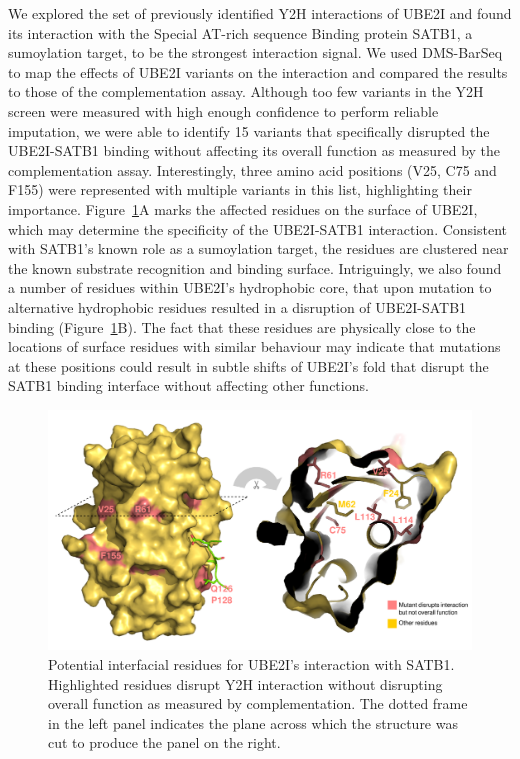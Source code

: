 
We explored the set of previously identified Y2H interactions of UBE2I and found its interaction with the Special AT-rich sequence Binding protein SATB1, a sumoylation target, to be the strongest interaction signal. We used DMS-BarSeq to map the effects of UBE2I variants on the interaction and compared the results to those of the complementation assay. Although too few variants in the Y2H screen were measured with high enough confidence to perform reliable imputation, we were able to identify 15 variants that specifically disrupted the UBE2I-SATB1 binding without affecting its overall function as measured by the complementation assay. Interestingly, three amino acid positions (V25, C75 and F155) were represented with multiple variants in this list, highlighting their importance. Figure~\ref{fig:y2hVScompl}A marks the affected residues on the surface of UBE2I, which may determine the specificity of the UBE2I-SATB1 interaction. Consistent with SATB1's known role as a sumoylation target, the residues are clustered near the known substrate recognition and binding surface. Intriguingly, we also found a number of residues within UBE2I's hydrophobic core, that upon mutation to alternative hydrophobic residues resulted in a disruption of UBE2I-SATB1 binding (Figure~\ref{fig:y2hVScompl}B). The fact that these residues are physically close to the locations of surface residues with similar behaviour may indicate that mutations at these positions could result in subtle shifts of UBE2I's fold that disrupt the SATB1 binding interface without affecting other functions.

\begin{figure}[h!]
	\centering
	\includegraphics[width=\textwidth]{img/satb1_interface.pdf}
	\caption{Potential interfacial residues for UBE2I's interaction with SATB1. Highlighted residues disrupt Y2H interaction without disrupting overall function as measured by complementation. The dotted frame in the left panel indicates the plane across which the structure was cut to produce the panel on the right.}
	\label{fig:y2hVScompl}
\end{figure}


